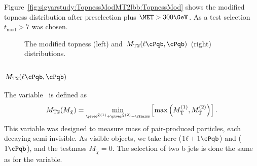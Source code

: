 Figure~\ref{fig:sigvarstudy:TopnessModMT2lbb:TopnessMod} shows the modified topness distribution after preselection plus $\MET>300\GeV$. As a test selection $t_\mathrm{mod}>7$ was chosen.

\begin{figure}
\caption{\label{fig:sigvarstudy:TopnessModMT2lbb} The modified topness (left) and $\MTt(\ell\cPqb,\cPqb)$ (right) distributions.}
\end{figure}

\subsubsection{$\MTt(\ell\cPqb,\cPqb)$}

The \MTt variable~\cite{Lester:1999tx} is defined as 
\begin{equation}
 \MTt(M_{\tilde{\chi}}) = \min_{\scriptscriptstyle\ptvec^{\tilde{\chi}(1)} + \ptvec^{\tilde{\chi}(2)} = \VEtmiss} \left[ \max \left( \MT^{(1)} , \MT^{(2)} \right) \right].
\end{equation}
This variable was designed to measure mass of pair-produced particles, each decaying semi-invisible. As visible objects, we take here ($1\ell + 1\cPqb$) and ($1\cPqb$), and the testmass $M_{\tilde{\chi}} = 0$.
The selection of two b jets is done the same as for the \MTtW variable.

